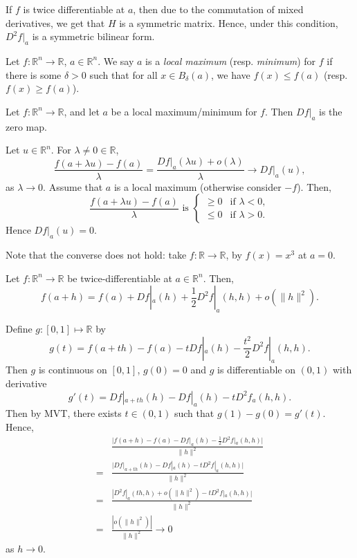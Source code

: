 \documentclass[12pt]{article}
\begin{document}
If $f$ is twice differentiable at $a$, then due to the commutation of mixed derivatives, we get that $H$ is a symmetric matrix. Hence, under this condition, $D^2f|_a$ is a symmetric bilinear form.

\begin{definition}
	Let $f : \mathbb{R}^{n} \to \mathbb{R}$, $a \in \mathbb{R}^{n}$. We say $a$ is a \textit{local maximum} (resp. \textit{minimum}) for $f$ if there is some $\delta > 0$ such that for all $x \in B_{\delta}(a)$, we have $f(x) \leq f(a)$ (resp. $f(x) \geq f(a)$).
\end{definition}

\begin{proposition}
	Let $f : \mathbb{R}^{n} \to \mathbb{R}$, and let $a$ be a local maximum/minimum for $f$. Then $Df|_a$ is the zero map.
\end{proposition}

\begin{proofbox}
	Let $u \in \mathbb{R}^{n}$. For $\lambda \neq 0 \in \mathbb{R}$, 
	\[
	\frac{f(a + \lambda u) - f(a)}{\lambda} = \frac{Df|_a(\lambda u) + o(\lambda)}{\lambda} \to Df|_a(u)
	,\]
	as $\lambda \to 0$. Assume that $a$ is a local maximum (otherwise consider $-f$). Then,
	\[
		\frac{f(a+\lambda u) - f(a)}{\lambda} \text{ is }
	\begin{cases}
		 \geq 0 & \text{if } \lambda < 0, \\
		 \leq 0 & \text{if } \lambda > 0.
	\end{cases}
	\]
	Hence $Df|_a(u) = 0$.
\end{proofbox}

Note that the converse does not hold: take $f : \mathbb{R} \to \mathbb{R}$, by $f(x) = x^3$ at $a = 0$.

\begin{lemma}
	Let $f : \mathbb{R}^{n} \to \mathbb{R}$ be twice-differentiable at $a \in \mathbb{R}^{n}$. Then,
	\[
	f(a+h) = f(a) + Df|_a(h) + \frac{1}{2} D^2f|_a(h,h) + o(\|h\|^2)
	.\]
\end{lemma}

\begin{proofbox}
	Define $g : [0, 1] \mapsto \mathbb{R}$ by
	\[
	g(t) = f(a + th) - f(a) - t Df|_a(h) - \frac{t^2}{2} D^2f|_a(h,h)
	.\]
	Then $g$ is continuous on $[0, 1]$, $g(0) = 0$ and $g$ is differentiable on $(0, 1)$ with derivative
	\[
	g'(t) = Df|_{a+th}(h) - Df|_a(h) - tD^2f_a(h, h)
	.\]
	Then by MVT, there exists $t \in (0, 1)$ such that $g(1) - g(0) = g'(t)$. Hence,
	\begin{align*}
		&\frac{|f(a+h)-f(a)-Df|_a(h) - \frac{1}{2}D^2f|_a(h,h)|}{\|h\|^2} \\
		=& \frac{|Df|_{a+th}(h) - Df|_a(h) - tD^2f|_a(h,h)|}{\|h\|^2} \\
		=& \frac{|D^2f|_a(th, h) + o(\|h\|^2) - tD^2f|_a(h, h)|}{\|h\|^2} \\
		=& \frac{|o(\|h\|^2)|}{\|h\|^2} \to 0
	\end{align*}
	as $h \to 0$.
\end{proofbox}
\end{document}
